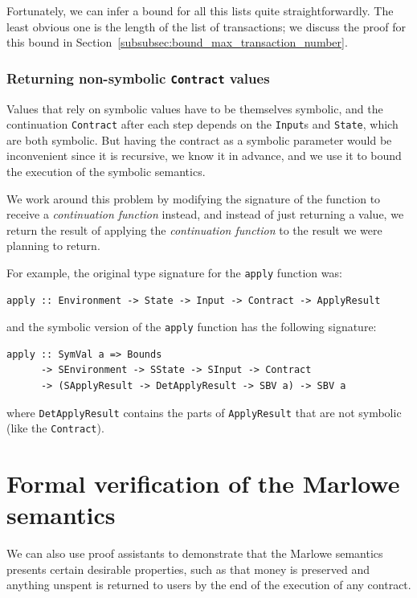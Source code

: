 \documentclass[runningheads]{llncs}
\begin{document}
Fortunately, we can infer a bound for all this lists quite straightforwardly. The least obvious one is the length of the list of transactions; we discuss the proof for this bound in Section~\ref{subsubsec:bound_max_transaction_number}.

\subsubsection{Returning non-symbolic \texttt{Contract} values}

Values that rely on symbolic values have to be themselves symbolic, and the continuation \texttt{Contract} after each step depends on the \texttt{Input}s and \texttt{State}, which are both symbolic. But having the contract as a symbolic parameter would be inconvenient since it is recursive, we know it in advance, and we use it to bound the execution of the symbolic semantics.

We work around this problem by modifying the signature of the function to receive a \textit{continuation function} instead, and instead of just returning a value, we return the result of applying the \textit{continuation function} to the result we were planning to return.

For example, the original type signature for the \texttt{apply} function was:

\begin{verbatim}
apply :: Environment -> State -> Input -> Contract -> ApplyResult
\end{verbatim}

\noindent
and the symbolic version of the \texttt{apply} function has the following signature:

\begin{verbatim}
apply :: SymVal a => Bounds
      -> SEnvironment -> SState -> SInput -> Contract
      -> (SApplyResult -> DetApplyResult -> SBV a) -> SBV a
\end{verbatim}

\noindent
where \texttt{DetApplyResult} contains the parts of \texttt{ApplyResult} that are not symbolic (like the \texttt{Contract}).

\section{Formal verification of the Marlowe semantics\label{sec:verification}}

We can also use proof assistants to demonstrate that the Marlowe semantics presents certain desirable properties, such as that money is preserved and anything unspent is returned to users by the end of the execution of any contract.
\end{document}
